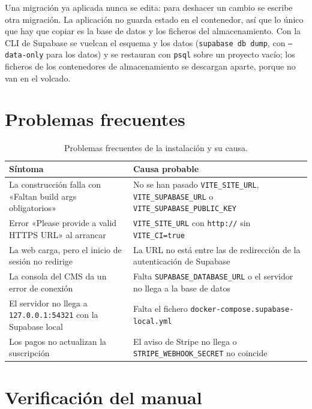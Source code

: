 Una migración ya aplicada nunca se edita: para deshacer un cambio se escribe
otra migración. La aplicación no guarda estado en el contenedor, así que lo
único que hay que copiar es la base de datos y los ficheros del
almacenamiento. Con la CLI de Supabase se vuelcan el esquema y los datos
(\texttt{supabase db dump}, con \texttt{--data-only} para los datos) y se
restauran con \texttt{psql} sobre un proyecto vacío; los ficheros de los
contenedores de almacenamiento se descargan aparte, porque no van en el
volcado.

\section{Problemas frecuentes}
\label{sec:ig-problemas}

\begin{table}[htbp]
  \centering
  \footnotesize
  \caption{Problemas frecuentes de la instalación y su causa.}
  \label{tab:ig-problemas}
  \begin{tabularx}{\textwidth}{@{}>{\raggedright\arraybackslash}p{6.2cm}X@{}}
    \toprule
    \textbf{Síntoma} & \textbf{Causa probable} \\
    \midrule
    La construcción falla con «Faltan build args obligatorios» & No se han pasado \texttt{VITE\_SITE\_URL}, \texttt{VITE\_SUPABASE\_URL} o \texttt{VITE\_SUPABASE\_PUBLIC\_KEY} \\
    Error «Please provide a valid HTTPS URL» al arrancar & \texttt{VITE\_SITE\_URL} con \texttt{http://} sin \texttt{VITE\_CI=true} \\
    La web carga, pero el inicio de sesión no redirige & La URL no está entre las de redirección de la autenticación de Supabase \\
    La consola del CMS da un error de conexión & Falta \texttt{SUPABASE\_DATABASE\_URL} o el servidor no llega a la base de datos \\
    El servidor no llega a \texttt{127.0.0.1:54321} con la Supabase local & Falta el fichero \texttt{docker-compose.supabase-local.yml} \\
    Los pagos no actualizan la suscripción & El aviso de Stripe no llega o \texttt{STRIPE\_WEBHOOK\_SECRET} no coincide \\
    \bottomrule
  \end{tabularx}
\end{table}

\section{Verificación del manual}
\label{sec:ig-verificacion}

